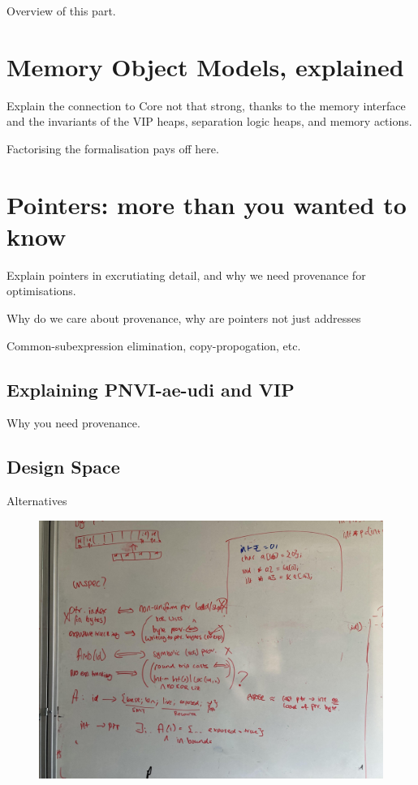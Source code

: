 Overview of this part.

\chapter{Memory Object Models, explained}\label{chap:mem-model-explained}

Explain the connection to Core \textemdash{} not that strong, thanks to the memory
interface and the invariants of the VIP heaps, separation logic heaps, and
memory actions.

Factorising the formalisation pays off here.

\chapter{Pointers: more than you wanted to know}

Explain pointers in excrutiating detail, and why we need provenance for
optimisations.

Why do we care about provenance, why are pointers not just addresses

Common-subexpression elimination, copy-propogation, etc.

\section{Explaining PNVI-ae-udi and VIP}

Why you need provenance.

\section{Design Space}

Alternatives

\begin{figure}[h]
    \centering
    \includegraphics[width=\textwidth]{../misc/type-system-options.jpg}
\end{figure}


